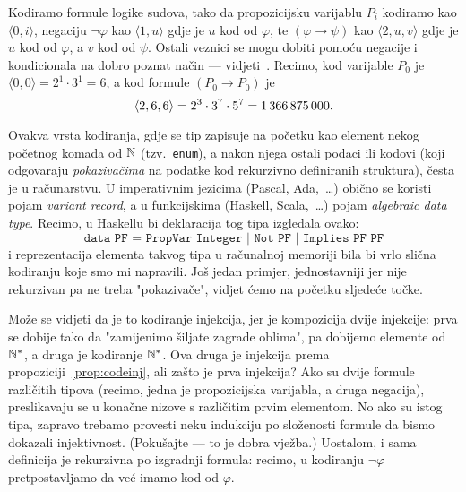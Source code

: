 \begin{primjer}\label{pr:lskod}
Kodiramo formule logike sudova, tako da propozicijsku varijablu $P_i$ kodiramo kao $\langle0,i\rangle$, negaciju $\lnot\varphi$ kao $\langle1,u\rangle$ gdje je $u$ kod od $\varphi$, te $(\varphi\to\psi)$ kao $\langle2,u,v\rangle$ gdje je $u$ kod od $\varphi$, a $v$ kod od $\psi$. Ostali veznici se mogu dobiti pomoću negacije i kondicionala na dobro poznat način --- vidjeti~\cite{skr:VukML}. Recimo, kod varijable $P_0$ je $\langle0,0\rangle=2^1\cdot3^1=6$, a kod formule $(P_0\to P_0)$ je \begin{equation}
    \langle2,6,6\rangle=2^3\cdot3^7\cdot5^7=1\,366\,875\,000\text.
\end{equation}

Ovakva vrsta kodiranja, gdje se tip zapisuje na početku kao element nekog početnog komada od ${\mathbb N}$ (tzv.\ \texttt{enum}), a nakon njega ostali podaci ili kodovi (koji odgovaraju \emph{pokazivačima} na podatke kod rekurzivno definiranih struktura), česta je u računarstvu. U imperativnim jezicima (Pascal, Ada,~\ldots) obično se koristi pojam \emph{variant record}, a u funkcijskima (Haskell, Scala,~\ldots) pojam \emph{algebraic data type}. Recimo, u Haskellu bi deklaracija tog tipa izgledala ovako:
\begin{equation}
\texttt{data PF = PropVar Integer | Not PF | Implies PF PF}
\end{equation}
i reprezentacija elementa takvog tipa u računalnoj memoriji bila bi vrlo slična kodiranju koje smo mi napravili. Još jedan primjer, jednostavniji jer nije rekurzivan pa ne treba "pokazivače", vidjet ćemo na početku sljedeće točke.

Može se vidjeti da je to kodiranje injekcija, jer je kompozicija dvije injekcije: prva se dobije tako da "zamijenimo šiljate zagrade oblima", pa dobijemo elemente od ${\mathbb N}^*$, a druga je kodiranje ${\mathbb N}^*$. Ova druga je injekcija prema propoziciji~\ref{prop:codeinj}, ali zašto je prva injekcija? Ako su dvije formule različitih tipova (recimo, jedna je propozicijska varijabla, a druga negacija), preslikavaju se u konačne nizove s različitim prvim elementom. No ako su istog tipa, zapravo trebamo provesti neku indukciju po složenosti formule da bismo dokazali injektivnost. (Pokušajte --- to je dobra vježba.) Uostalom, i sama definicija je rekurzivna po izgradnji formula: recimo, u kodiranju $\lnot\varphi$ pretpostavljamo da već imamo kod od $\varphi$.


\end{primjer}
